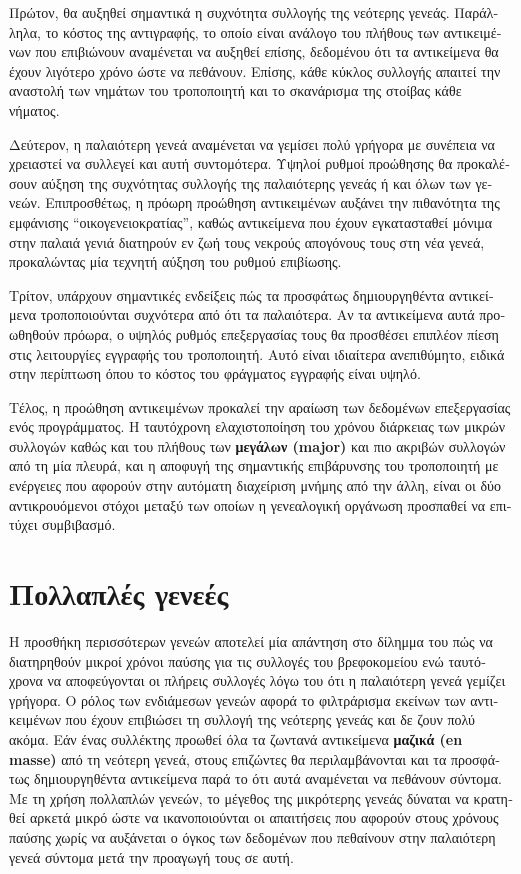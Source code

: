 \begin{greek}
Πρώτον, θα αυξηθεί σημαντικά η συχνότητα συλλογής της νεότερης γενεάς. Παράλληλα, το 
κόστος της αντιγραφής, το οποίο είναι ανάλογο του πλήθους των αντικειμένων που επιβιώνουν 
αναμένεται να αυξηθεί επίσης, δεδομένου ότι τα αντικείμενα θα έχουν λιγότερο χρόνο
ώστε να πεθάνουν. Επίσης, κάθε κύκλος συλλογής απαιτεί την αναστολή των νημάτων του
τροποποιητή και το σκανάρισμα της στοίβας κάθε νήματος.

Δεύτερον, η παλαιότερη γενεά αναμένεται να γεμίσει πολύ γρήγορα με συνέπεια να χρειαστεί
να συλλεγεί και αυτή συντομότερα. Υψηλοί ρυθμοί προώθησης θα προκαλέσουν αύξηση της
συχνότητας συλλογής της παλαιότερης γενεάς ή και όλων των γενεών. Επιπροσθέτως, η
πρόωρη προώθηση αντικειμένων αυξάνει την πιθανότητα της εμφάνισης ``οικογενειοκρατίας'',
καθώς αντικείμενα που έχουν εγκατασταθεί μόνιμα στην παλαιά γενιά διατηρούν εν ζωή τους
νεκρούς απογόνους τους στη νέα γενεά, προκαλώντας μία τεχνητή αύξηση του ρυθμού 
επιβίωσης.
 
Τρίτον, υπάρχουν σημαντικές ενδείξεις πώς τα προσφάτως δημιουργηθέντα αντικείμενα
τροποποιούνται συχνότερα από ότι τα παλαιότερα. Αν τα αντικείμενα αυτά προωθηθούν 
πρόωρα, ο υψηλός ρυθμός επεξεργασίας τους θα προσθέσει επιπλέον πίεση στις λειτουργίες
εγγραφής του τροποποιητή. Αυτό είναι ιδιαίτερα ανεπιθύμητο, ειδικά στην περίπτωση όπου
το κόστος του φράγματος εγγραφής είναι υψηλό. 

Τέλος, η προώθηση αντικειμένων προκαλεί την αραίωση των δεδομένων επεξεργασίας ενός
προγράμματος. Η ταυτόχρονη ελαχιστοποίηση του χρόνου διάρκειας των μικρών συλλογών καθώς 
και του πλήθους των \textbf{μεγάλων (major)} και πιο ακριβών συλλογών από τη μία πλευρά, 
και η αποφυγή της σημαντικής επιβάρυνσης του τροποποιητή με ενέργειες που αφορούν στην 
αυτόματη διαχείριση μνήμης από την άλλη, είναι οι δύο αντικρουόμενοι στόχοι μεταξύ των 
οποίων η γενεαλογική οργάνωση προσπαθεί να επιτύχει συμβιβασμό.

\section{Πολλαπλές γενεές}
Η προσθήκη περισσότερων γενεών αποτελεί μία απάντηση στο δίλημμα του πώς να διατηρηθούν
μικροί χρόνοι παύσης για τις συλλογές του βρεφοκομείου ενώ ταυτόχρονα να αποφεύγονται οι
πλήρεις συλλογές λόγω του ότι η παλαιότερη γενεά γεμίζει γρήγορα. Ο ρόλος των ενδιάμεσων
γενεών αφορά το φιλτράρισμα εκείνων των αντικειμένων που έχουν επιβιώσει τη συλλογή της 
νεότερης γενεάς και δε ζουν πολύ ακόμα. Εάν ένας συλλέκτης προωθεί όλα τα ζωντανά
αντικείμενα \textbf{μαζικά (en masse)} από τη νεότερη γενεά, στους επιζώντες θα 
περιλαμβάνονται και τα προσφάτως δημιουργηθέντα αντικείμενα παρά το ότι αυτά αναμένεται
να πεθάνουν σύντομα. Με τη χρήση πολλαπλών γενεών, το μέγεθος της μικρότερης γενεάς
δύναται να κρατηθεί αρκετά μικρό ώστε να ικανοποιούνται οι απαιτήσεις που αφορούν στους
χρόνους παύσης χωρίς να αυξάνεται ο όγκος των δεδομένων που πεθαίνουν στην παλαιότερη
γενεά σύντομα μετά την προαγωγή τους σε αυτή.


\end{greek}
